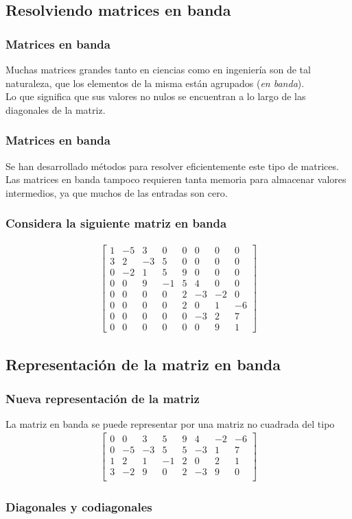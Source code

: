 \subsection{Resolviendo matrices en banda}
\begin{frame}
\frametitle{Matrices en banda}
Muchas matrices grandes tanto en ciencias como en ingeniería son de tal naturaleza, que los elementos de la misma están agrupados (\emph{en banda}).
\\
\bigskip
Lo que significa que sus valores no nulos se encuentran a lo largo de las diagonales de la matriz.
\end{frame}
\begin{frame}
\frametitle{Matrices en banda}
Se han desarrollado métodos para resolver eficientemente este tipo de matrices.
\\
\bigskip
Las matrices en banda tampoco requieren tanta memoria para almacenar valores intermedios, ya que muchos de las entradas son cero.
\end{frame}
\begin{frame}[plain]
\frametitle{Considera la siguiente matriz en banda}
\begin{align*}
\begin{bmatrix}
1 & -5 & 3 & 0 & 0 & 0 & 0 & 0 \\
3 & 2 & -3 & 5 & 0 & 0 & 0 & 0 \\
0 & -2 & 1 & 5 & 9 & 0 & 0 & 0 \\
0 & 0 & 9 & -1 & 5 & 4 & 0 & 0 \\
0 & 0 & 0 & 0 & 2 & -3 & -2 & 0 \\
0 & 0 & 0 & 0 & 2 & 0 & 1 & -6 \\
0 & 0 & 0 & 0 & 0 & -3 & 2 & 7 \\
0 & 0 & 0 & 0 & 0 & 0 & 9 & 1 
\end{bmatrix}
\end{align*}
\end{frame}
\subsection{Representación de la matriz en banda}
\begin{frame}
\frametitle{Nueva representación de la matriz}
La matriz en banda se puede representar por una matriz no cuadrada del tipo
\pause
\begin{align*}
\begin{bmatrix}
0 & 0 & 3 & 5 & 9 & 4 & -2 & -6 \\
0 & -5 & -3 & 5 & 5 & -3 & 1 & 7 \\
1 & 2 & 1 & -1 & 2 & 0 & 2 & 1 \\
3 & -2 & 9 & 0 & 2 & -3 & 9 & 0 \\
\end{bmatrix}    
\end{align*}
\end{frame}
\begin{frame}[plain]
\frametitle{Diagonales y codiagonales}
\begin{figure}
	\centering
	    
\end{figure}
\end{frame}
